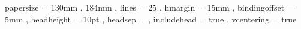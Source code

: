 \geometry
\mybegin %
	papersize     = { 130mm , 184mm } ,
	lines         = 25 ,
	hmargin       = 15mm ,
	bindingoffset = 5mm ,
	headheight    = 10pt ,
	headsep       = \baselineskip ,
	includehead   = true ,
	vcentering    = true
\myend %
